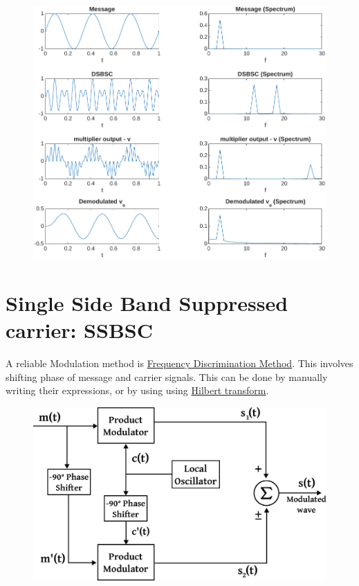 \begin{figure}[H]
	\centering
	\includegraphics[width=\textwidth]{img/dsbsc.pdf}
\end{figure}

\section{Single Side Band Suppressed carrier: SSBSC}

A reliable Modulation method is  \underline{Frequency Discrimination Method}. This involves shifting phase of message and carrier signals. This can be done by manually writing their expressions, or by using using \href{https://en.wikipedia.org/wiki/Hilbert_transform}{Hilbert transform}.

\begin{figure}[H]
	\centering
	\includegraphics[width=.7\textwidth]{img/freq_disc.pdf}
\end{figure}


